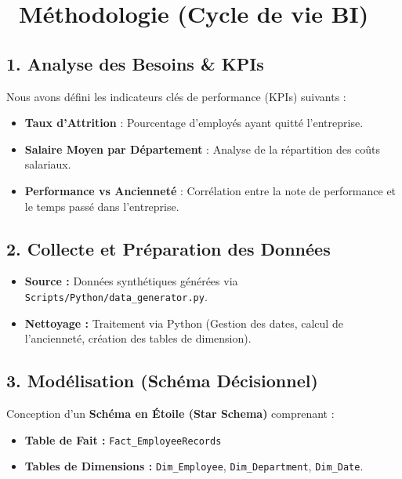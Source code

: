\documentclass[11pt, a4paper]{article}
\begin{document}
\vspace{0.5cm}

\section*{\faRocket \ Méthodologie (Cycle de vie BI)}

\subsection*{1. Analyse des Besoins \& KPIs}
Nous avons défini les indicateurs clés de performance (KPIs) suivants :
\begin{itemize}
    \item \textbf{Taux d'Attrition} : Pourcentage d'employés ayant quitté l'entreprise.
    \item \textbf{Salaire Moyen par Département} : Analyse de la répartition des coûts salariaux.
    \item \textbf{Performance vs Ancienneté} : Corrélation entre la note de performance et le temps passé dans l'entreprise.
\end{itemize}

\subsection*{2. Collecte et Préparation des Données}
\begin{itemize}
    \item \textbf{Source :} Données synthétiques générées via \texttt{Scripts/Python/data\_generator.py}.
    \item \textbf{Nettoyage :} Traitement via Python (Gestion des dates, calcul de l'ancienneté, création des tables de dimension).
\end{itemize}

\subsection*{3. Modélisation (Schéma Décisionnel)}
Conception d'un \textbf{Schéma en Étoile (Star Schema)} comprenant :
\begin{itemize}
    \item \textbf{Table de Fait :} \texttt{Fact\_EmployeeRecords}
    \item \textbf{Tables de Dimensions :} \texttt{Dim\_Employee}, \texttt{Dim\_Department}, \texttt{Dim\_Date}.
\end{itemize}

\vspace{0.5cm}
\end{document}
